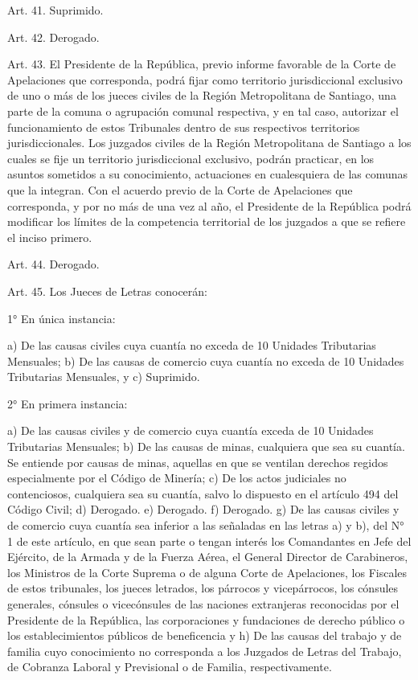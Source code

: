     Art. 41. Suprimido.

    Art. 42. Derogado.


    Art. 43. El Presidente de la República, previo informe favorable de la Corte de Apelaciones que corresponda, podrá fijar como territorio jurisdiccional exclusivo de uno o más de los jueces civiles de la Región Metropolitana de Santiago, una parte de la comuna o agrupación comunal respectiva, y en tal caso, autorizar el funcionamiento de estos Tribunales dentro de sus respectivos territorios jurisdiccionales.
    Los juzgados civiles de la Región Metropolitana de Santiago a los cuales se fije un territorio jurisdiccional exclusivo, podrán practicar, en los asuntos sometidos a su conocimiento, actuaciones en cualesquiera de las comunas que la integran.
    Con el acuerdo previo de la Corte de Apelaciones que corresponda, y por no más de una vez al año, el Presidente de la República podrá modificar los límites de la competencia territorial de los juzgados a que se refiere el inciso primero.


    Art. 44. Derogado.


    Art. 45. Los Jueces de Letras conocerán:

    1° En única instancia:

    a) De las causas civiles cuya cuantía no exceda de 10 Unidades Tributarias Mensuales;
    b) De las causas de comercio cuya cuantía no exceda de 10 Unidades Tributarias Mensuales, y
    c) Suprimido.

    2° En primera instancia:

    a) De las causas civiles y de comercio cuya cuantía exceda de 10 Unidades Tributarias Mensuales;
    b) De las causas de minas, cualquiera que sea su cuantía. Se entiende por causas de minas, aquellas en que se ventilan derechos regidos especialmente por el Código de Minería;
    c) De los actos judiciales no contenciosos, cualquiera sea su cuantía, salvo lo dispuesto en el artículo 494 del Código Civil;
    d) Derogado.
    e) Derogado.
    f) Derogado.
    g) De las causas civiles y de comercio cuya cuantía sea inferior a las señaladas en las letras a) y b), del N° 1 de este artículo, en que sean parte o tengan interés los Comandantes en Jefe del Ejército, de la Armada y de la Fuerza Aérea, el General Director de Carabineros, los Ministros de la Corte Suprema o de alguna Corte de Apelaciones, los Fiscales de estos tribunales, los jueces letrados, los párrocos y vicepárrocos, los cónsules generales, cónsules o vicecónsules de las naciones extranjeras reconocidas por el Presidente de la República, las corporaciones y fundaciones de derecho público o los establecimientos públicos de beneficencia y
    h) De las causas del trabajo y de familia cuyo conocimiento no corresponda a los Juzgados de Letras del Trabajo, de Cobranza Laboral y Previsional o de Familia, respectivamente.


